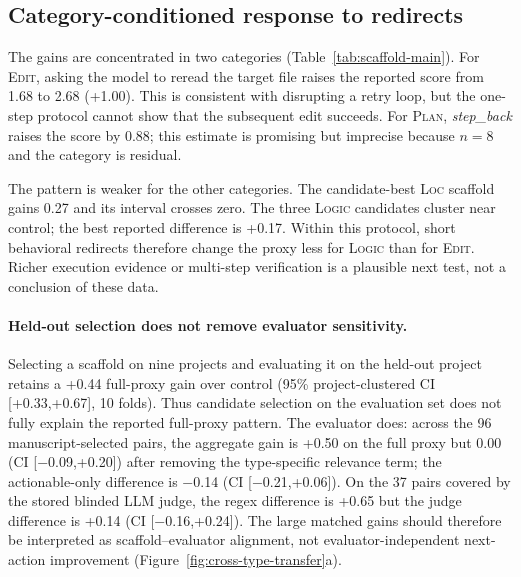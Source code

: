 \documentclass{article}
\begin{document}
\subsection{Category-conditioned response to redirects}
\label{sec:scaffoldability}

The gains are concentrated in two categories (Table~\ref{tab:scaffold-main}).
For \textsc{Edit}, asking the model to reread the target file raises the reported
score from 1.68 to 2.68 (+1.00).  This is consistent with disrupting a retry
loop, but the one-step protocol cannot show that the subsequent edit succeeds.
For \textsc{Plan}, \emph{step\_back} raises the score by 0.88; this estimate is
promising but imprecise because $n=8$ and the category is residual.

The pattern is weaker for the other categories.  The candidate-best
\textsc{Loc} scaffold gains 0.27 and its interval crosses zero.  The three
\textsc{Logic} candidates cluster near control; the best reported difference is
+0.17.  Within this protocol, short behavioral redirects therefore change the
proxy less for \textsc{Logic} than for \textsc{Edit}.  Richer execution evidence
or multi-step verification is a plausible next test, not a conclusion of these
data.

\paragraph{Held-out selection does not remove evaluator sensitivity.}
Selecting a scaffold on nine projects and evaluating it on the held-out project
retains a +0.44 full-proxy gain over control (95\% project-clustered CI
[+0.33,+0.67], 10 folds).  Thus candidate selection on the evaluation set does
not fully explain the reported full-proxy pattern.  The evaluator does: across
the 96 manuscript-selected pairs, the aggregate gain is +0.50 on the full proxy
but 0.00 (CI [$-$0.09,+0.20]) after removing the type-specific relevance term;
the actionable-only difference is $-$0.14 (CI [$-$0.21,+0.06]).  On the 37 pairs
covered by the stored blinded LLM judge, the regex difference is +0.65 but the
judge difference is +0.14 (CI [$-$0.16,+0.24]).  The large matched gains should
therefore be interpreted as scaffold--evaluator alignment, not
evaluator-independent next-action improvement
(Figure~\ref{fig:cross-type-transfer}a).
\end{document}
